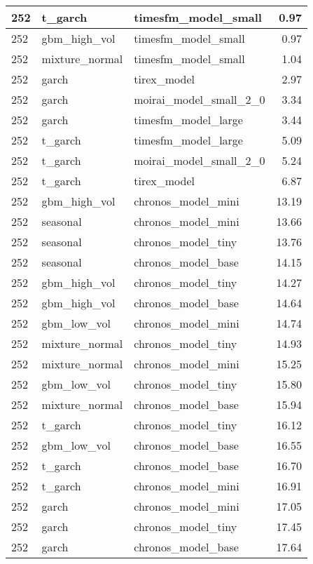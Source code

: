 {\begin{tabular}{lllr}
\midrule
252 & t\_garch & timesfm\_model\_small & 0.97 \\
\midrule
252 & gbm\_high\_vol & timesfm\_model\_small & 0.97 \\
\midrule
252 & mixture\_normal & timesfm\_model\_small & 1.04 \\
\midrule
252 & garch & tirex\_model & 2.97 \\
\midrule
252 & garch & moirai\_model\_small\_2\_0 & 3.34 \\
\midrule
252 & garch & timesfm\_model\_large & 3.44 \\
\midrule
252 & t\_garch & timesfm\_model\_large & 5.09 \\
\midrule
252 & t\_garch & moirai\_model\_small\_2\_0 & 5.24 \\
\midrule
252 & t\_garch & tirex\_model & 6.87 \\
\midrule
252 & gbm\_high\_vol & chronos\_model\_mini & 13.19 \\
\midrule
252 & seasonal & chronos\_model\_mini & 13.66 \\
\midrule
252 & seasonal & chronos\_model\_tiny & 13.76 \\
\midrule
252 & seasonal & chronos\_model\_base & 14.15 \\
\midrule
252 & gbm\_high\_vol & chronos\_model\_tiny & 14.27 \\
\midrule
252 & gbm\_high\_vol & chronos\_model\_base & 14.64 \\
\midrule
252 & gbm\_low\_vol & chronos\_model\_mini & 14.74 \\
\midrule
252 & mixture\_normal & chronos\_model\_tiny & 14.93 \\
\midrule
252 & mixture\_normal & chronos\_model\_mini & 15.25 \\
\midrule
252 & gbm\_low\_vol & chronos\_model\_tiny & 15.80 \\
\midrule
252 & mixture\_normal & chronos\_model\_base & 15.94 \\
\midrule
252 & t\_garch & chronos\_model\_tiny & 16.12 \\
\midrule
252 & gbm\_low\_vol & chronos\_model\_base & 16.55 \\
\midrule
252 & t\_garch & chronos\_model\_base & 16.70 \\
\midrule
252 & t\_garch & chronos\_model\_mini & 16.91 \\
\midrule
252 & garch & chronos\_model\_mini & 17.05 \\
\midrule
252 & garch & chronos\_model\_tiny & 17.45 \\
\midrule
252 & garch & chronos\_model\_base & 17.64 \\
\bottomrule
\end{tabular}
}
